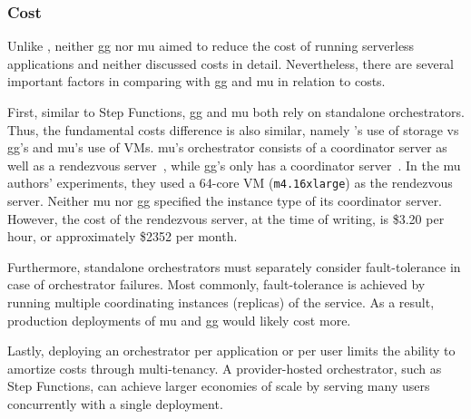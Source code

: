 \subsubsection{Cost}

Unlike \name{}, neither gg nor mu aimed to reduce the cost of running
serverless applications and neither discussed costs in detail. Nevertheless,
there are several important factors in comparing \name{} with gg and mu in
relation to costs.

First, similar to Step Functions, gg and mu both rely on standalone
orchestrators. Thus, the fundamental costs difference is also similar, namely
\name{}'s use of storage vs gg's and mu's use of VMs. mu's orchestrator
consists of a coordinator server as well as a rendezvous
server~\cite{excamera}, while gg's only has a coordinator
server~\cite{gg-atc}. In the mu authors' experiments, they used a 64-core VM
(\texttt{m4.16xlarge}) as the rendezvous server. Neither mu nor gg specified
the instance type of its coordinator server. However, the cost of the
rendezvous server, at the time of writing, is \$3.20 per hour, or
approximately \$2352 per month.

Furthermore, standalone orchestrators must separately consider fault-tolerance
in case of orchestrator failures. Most commonly, fault-tolerance is achieved
by running multiple coordinating instances (replicas) of the service. As a
result, production deployments of mu and gg would likely cost more.

Lastly, deploying an orchestrator per application or per user limits the
ability to amortize costs through multi-tenancy. A provider-hosted
orchestrator, such as Step Functions, can achieve larger economies of scale by
serving many users concurrently with a single deployment.
